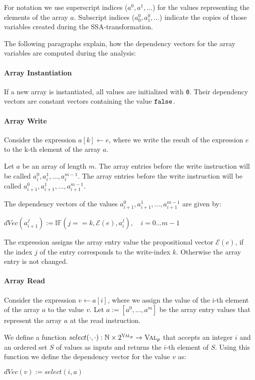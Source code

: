 For notation we use superscript indices ($a^0, a^1, ...$) for the values representing the elements of the array $a$. Subscript indices ($a^0_0, a^0_1,...$) indicate the copies of those variables created during the SSA-transformation.

The following paragraphs explain, how the dependency vectors for the array variables are computed during the analysis:

\paragraph{Array Instantiation}
If a new array is instantiated, all values are initialized with \texttt{0}. Their dependency vectors are constant vectors containing the value $\mathtt{false}$.

\paragraph{Array Write}
Consider the expression $a[k] \leftarrow e$, where we write the result of the expression $e$ to the k-th element of the array $a$.

Let $a$ be an array of length $m$. The array entries before the write instruction will be called $a_i^0, a_i^1,..., a_i^{m-1}$.  The array entries before the write instruction will be called $a_{i+1}^0, a_{i+1}^1,..., a_{i+1}^{m-1}$.

The dependency vectors of the values $a_{i+1}^0, a_{i+1}^1,..., a_{i+1}^{m-1}$ are given by:
\begin{center}
    $dVec(a_{i+1}^j) := \mathbb{IF}(j == k, \mathcal{E}(e), a_i^j), \quad i = 0...m-1$
\end{center}
The expression assigns the array entry value the propositional vector $\mathcal{E}(e)$, if the index $j$ of the entry corresponds to the write-index $k$. Otherwise the array entry is not changed.

\paragraph{Array Read}
Consider the expression $v \leftarrow a[i]$, where we assign the value of the i-th element of the array $a$ to the value $v$.
Let $a := [a^0, ..., a^m]$ be the array entry values that represent the array $a$ at the read instruction.

We define a function $select(\cdot, \cdot): \mathbb{N} \times 2^{\textsc{Val}_p} \to \textsc{Val}_p$ that accepts an integer $i$ and an ordered set $S$ of values as inputs and returns the $i$-th element of $S$. Using this function we define the dependency vector for the value $v$ as:
\begin{center}
    $dVec(v) := select(i, a)$
\end{center}